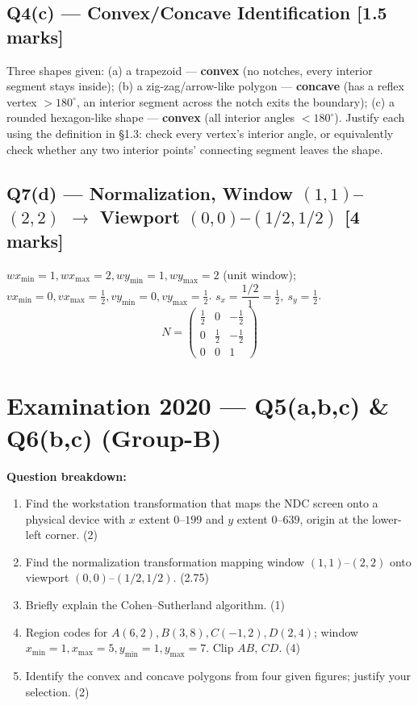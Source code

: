 \documentclass[12pt, a4paper]{article}
\newenvironment{solutionbox}{\begin{mdframed}[style=solutionframe]}{\end{mdframed}}
\newenvironment{answerbox}{\begin{mdframed}[style=answerframe]}{\end{mdframed}}
\begin{document}
\subsection*{Q4(c) --- Convex/Concave Identification [1.5 marks]}
\begin{answerbox}
Three shapes given: (a) a trapezoid --- \textbf{convex} (no notches, every interior segment stays inside); (b) a zig-zag/arrow-like polygon --- \textbf{concave} (has a reflex vertex $>180^\circ$, an interior segment across the notch exits the boundary); (c) a rounded hexagon-like shape --- \textbf{convex} (all interior angles $<180^\circ$). Justify each using the definition in \S1.3: check every vertex's interior angle, or equivalently check whether any two interior points' connecting segment leaves the shape.
\end{answerbox}

\subsection*{Q7(d) --- Normalization, Window $(1,1)$--$(2,2)$ $\to$ Viewport $(0,0)$--$(1/2,1/2)$ [4 marks]}
\begin{solutionbox}
$wx_{\min}=1,wx_{\max}=2,wy_{\min}=1,wy_{\max}=2$ (unit window); $vx_{\min}=0,vx_{\max}=\frac12,vy_{\min}=0,vy_{\max}=\frac12$. $s_x=\dfrac{1/2}{1}=\frac12,\ s_y=\frac12$.
$$N=\begin{pmatrix}\tfrac12&0&-\tfrac12\\0&\tfrac12&-\tfrac12\\0&0&1\end{pmatrix}$$
\end{solutionbox}

\section{Examination 2020 --- Q5(a,b,c) \& Q6(b,c) (Group-B)}
\begin{solutionbox}
\textbf{Question breakdown:}
\begin{enumerate}[noitemsep]
  \item[Q5(a)] Find the workstation transformation that maps the NDC screen onto a physical device with $x$ extent $0$--$199$ and $y$ extent $0$--$639$, origin at the lower-left corner. (2)
  \item[Q5(b)] Find the normalization transformation mapping window $(1,1)$--$(2,2)$ onto viewport $(0,0)$--$(1/2,1/2)$. (2.75)
  \item[Q5(c)] Briefly explain the Cohen--Sutherland algorithm. (1)
  \item[Q6(b)] Region codes for $A(6,2),B(3,8),C(-1,2),D(2,4)$; window $x_{\min}=1,x_{\max}=5,y_{\min}=1,y_{\max}=7$. Clip $AB$, $CD$. (4)
  \item[Q6(c)] Identify the convex and concave polygons from four given figures; justify your selection. (2)
\end{enumerate}
\end{solutionbox}
\end{document}
